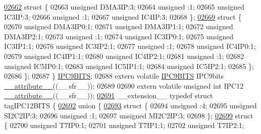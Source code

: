 \begin{DoxyCode}
\hypertarget{a00015_source_l02662}{}\hyperlink{a00015}{02662}     \textcolor{keyword}{struct }\{
02663       \textcolor{keywordtype}{unsigned} DMA3IP:3;
02664       \textcolor{keywordtype}{unsigned} :1;
02665       \textcolor{keywordtype}{unsigned} IC3IP:3;
02666       \textcolor{keywordtype}{unsigned} :1;
02667       \textcolor{keywordtype}{unsigned} IC4IP:3;
02668     \};
\hypertarget{a00015_source_l02669}{}\hyperlink{a00015}{02669}     \textcolor{keyword}{struct }\{
02670       \textcolor{keywordtype}{unsigned} DMA3IP0:1;
02671       \textcolor{keywordtype}{unsigned} DMA3IP1:1;
02672       \textcolor{keywordtype}{unsigned} DMA3IP2:1;
02673       \textcolor{keywordtype}{unsigned} :1;
02674       \textcolor{keywordtype}{unsigned} IC3IP0:1;
02675       \textcolor{keywordtype}{unsigned} IC3IP1:1;
02676       \textcolor{keywordtype}{unsigned} IC3IP2:1;
02677       \textcolor{keywordtype}{unsigned} :1;
02678       \textcolor{keywordtype}{unsigned} IC4IP0:1;
02679       \textcolor{keywordtype}{unsigned} IC4IP1:1;
02680       \textcolor{keywordtype}{unsigned} IC4IP2:1;
02681       \textcolor{keywordtype}{unsigned} :1;
02682       \textcolor{keywordtype}{unsigned} IC5IP0:1;
02683       \textcolor{keywordtype}{unsigned} IC5IP1:1;
02684       \textcolor{keywordtype}{unsigned} IC5IP2:1;
02685     \};
02686   \};
02687 \} \hyperlink{a00014_d8/da5/a00570}{IPC9BITS};
02688 \textcolor{keyword}{extern} \textcolor{keyword}{volatile} \hyperlink{a00014_d8/da5/a00570}{IPC9BITS} IPC9bits \hyperlink{a00015_a493c46f03454991ccc5aa7a6e1dfb2a7}{\_\_attribute\_\_}((\_\_sfr\_\_));
02689 
02690 \textcolor{keyword}{extern} \textcolor{keyword}{volatile} \textcolor{keywordtype}{unsigned} \textcolor{keywordtype}{int}  IPC12 \hyperlink{a00015_a493c46f03454991ccc5aa7a6e1dfb2a7}{\_\_attribute\_\_}((\_\_sfr\_\_));
\hypertarget{a00015_source_l02691}{}\hyperlink{a00014}{02691} \_\_extension\_\_ \textcolor{keyword}{typedef} \textcolor{keyword}{struct }tagIPC12BITS \{
\hypertarget{a00015_source_l02692}{}\hyperlink{a00015}{02692}   \textcolor{keyword}{union }\{
\hypertarget{a00015_source_l02693}{}\hyperlink{a00015}{02693}     \textcolor{keyword}{struct }\{
02694       \textcolor{keywordtype}{unsigned} :4;
02695       \textcolor{keywordtype}{unsigned} SI2C2IP:3;
02696       \textcolor{keywordtype}{unsigned} :1;
02697       \textcolor{keywordtype}{unsigned} MI2C2IP:3;
02698     \};
\hypertarget{a00015_source_l02699}{}\hyperlink{a00015}{02699}     \textcolor{keyword}{struct }\{
02700       \textcolor{keywordtype}{unsigned} T7IP0:1;
02701       \textcolor{keywordtype}{unsigned} T7IP1:1;
02702       \textcolor{keywordtype}{unsigned} T7IP2:1;

\end{DoxyCode}
